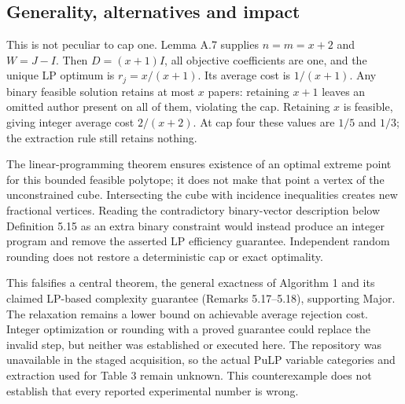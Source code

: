 \documentclass[10pt]{article}
\begin{document}
\subsection*{Generality, alternatives and impact}
This is not peculiar to cap one. Lemma A.7 supplies \(n=m=x+2\) and \(W=J-I\). Then \(D=(x+1)I\), all objective coefficients are one, and the unique LP optimum is \(r_j=x/(x+1)\). Its average cost is \(1/(x+1)\). Any binary feasible solution retains at most \(x\) papers: retaining \(x+1\) leaves an omitted author present on all of them, violating the cap. Retaining \(x\) is feasible, giving integer average cost \(2/(x+2)\). At cap four these values are \(1/5\) and \(1/3\); the extraction rule still retains nothing.\par
The linear-programming theorem ensures existence of an optimal extreme point for this bounded feasible polytope; it does not make that point a vertex of the unconstrained cube. Intersecting the cube with incidence inequalities creates new fractional vertices. Reading the contradictory binary-vector description below Definition 5.15 as an extra binary constraint would instead produce an integer program and remove the asserted LP efficiency guarantee. Independent random rounding does not restore a deterministic cap or exact optimality.\par
This falsifies a central theorem, the general exactness of Algorithm 1 and its claimed LP-based complexity guarantee (Remarks 5.17–5.18), supporting Major. The relaxation remains a lower bound on achievable average rejection cost. Integer optimization or rounding with a proved guarantee could replace the invalid step, but neither was established or executed here. The repository was unavailable in the staged acquisition, so the actual PuLP variable categories and extraction used for Table 3 remain unknown. This counterexample does not establish that every reported experimental number is wrong.\par
\end{document}
